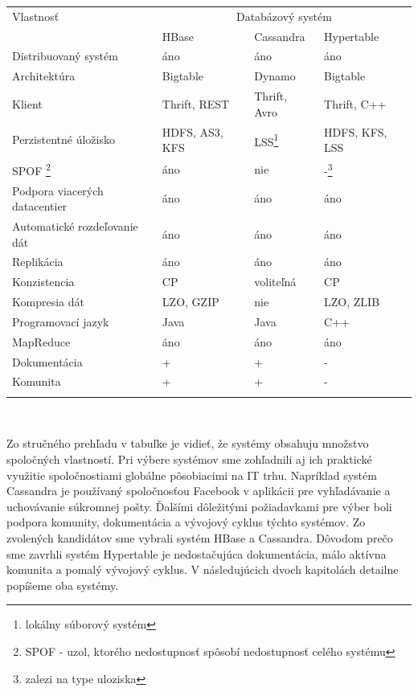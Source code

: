 \documentclass[11pt,twoside,a4paper]{book}
\begin{document}
{\centering\par\bigskip
\begin{tabular}{l@{\hspace{2.5em}}lll}\toprule
Vlastnosť & \multicolumn{3}{c}{Databázový systém} \\
			& \multicolumn{1}{l}{HBase} & \multicolumn{1}{l}{Cassandra} & \multicolumn{1}{l}{Hypertable}\\\midrule\addlinespace

Distribuovaný systém	& áno  & áno & áno 				\\\addlinespace
Architektúra		& Bigtable  & Dynamo & Bigtable	\\\addlinespace
Klient 			& Thrift, REST  & Thrift, Avro & Thrift, C++ 	\\\addlinespace
Perzistentné úložisko	& HDFS, AS3, KFS  & LSS\footnote{lokálny súborový systém} & HDFS, KFS, LSS		\\\addlinespace
SPOF \footnote{SPOF - uzol, ktorého nedostupnosť spôsobí nedostupnosť celého systému}	& áno  & nie & -\footnote{zalezi na type uloziska} 	\\\addlinespace
Podpora viacerých datacentier & áno  & áno & áno 			\\\addlinespace
Automatické rozdeľovanie dát 	& áno  & áno & áno 			\\\addlinespace
Replikácia 		& áno  & áno & áno 				\\\addlinespace
Konzistencia 		& CP  & voliteľná & CP 				\\\addlinespace
Kompresia dát		& LZO, GZIP  & nie & LZO, ZLIB 				\\\addlinespace
Programovací jazyk 	& Java  & Java & C++ 				\\\addlinespace
MapReduce 		& áno  & áno & áno 				\\\addlinespace
Dokumentácia		& +  & +  & - 					\\\addlinespace
Komunita 		& +  & +  & - 					\\\addlinespace\bottomrule

\end{tabular}\\}
\label{tab:Nosql}
\par\bigskip



Zo stručného prehľadu v tabuľke je vidieť, že systémy obsahuju množstvo spoločných vlastností. Pri výbere systémov sme zohľadnili aj ich praktické využitie spoločnostiami globálne pôsobiacimi na IT trhu. Napríklad systém Cassandra je používaný spoločnosťou Facebook v aplikácii pre vyhľadávanie a uchovávanie súkromnej pošty. Ďalšími dôležitými požiadavkami pre výber boli podpora komunity, dokumentácia a vývojový cyklus týchto systémov. Zo zvolených kandidátov sme vybrali systém HBase a Cassandra. Dôvodom prečo sme zavrhli systém Hypertable je nedostačujúca dokumentácia, málo aktívna komunita a pomalý vývojový cyklus. V následujúcich dvoch kapitolách detailne popíšeme oba systémy.
\end{document}
